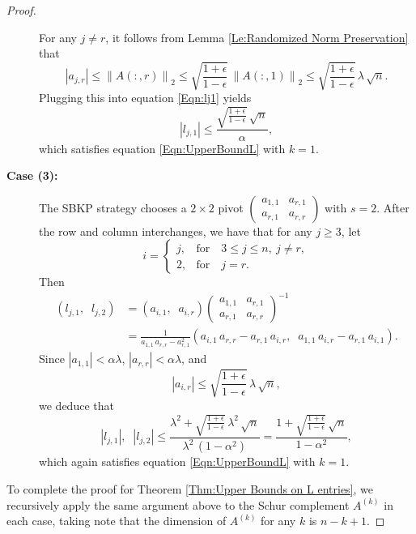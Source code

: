 \documentclass[11pt]{article}
\begin{document}
\begin{proof}
\begin{description}
For any $j \neq r$, it follows from Lemma \ref{Le:Randomized Norm Preservation} that 
$$
|a_{j, r} | \le \left\| A( : , r) \right\|_2 \le \sqrt{\frac{1 + \epsilon}{1 - \epsilon}}\, \left\|A( : , 1) \right\|_2 \le \sqrt{\frac{1 + \epsilon}{1 - \epsilon}}\, \lambda \, \sqrt{n}. 
$$
Plugging this into equation \eqref{Eqn:lj1} yields 
\[{\displaystyle \left| l_{j, 1} \right|  \le \frac{\sqrt{\frac{1 + \epsilon}{1 - \epsilon}} \, \sqrt{n}}{\alpha}}, \]
which satisfies equation \eqref{Eqn:UpperBoundL} with $k=1$. 
\item[{\bf Case (3):}] The SBKP strategy chooses a $2 \times 2$ pivot $\left( 
\begin{array}{cc}
a_{1,1} & a_{r,1} \\
a_{r,1} & a_{r,r}
\end{array}
\right)$ with $s = 2$. After the row and column interchanges, we have that for any $j \ge 3$, let 
\[ 
i = \left\{\begin{array}{ll} 
j, & \mbox{for}\quad 3 \le j \le n, ~j \not= r, \\
2, & \mbox{for}\quad j = r.\end{array}\right.\]
Then 
\begin{align*}
\left(l_{j, 1}, \;\; l_{j, 2}\right) &= \left(a_{i, 1}, \;\; a_{i, r}\right)  \left(
\begin{array}{cc}
a_{1,1} & a_{r,1} \\
a_{r,1} & a_{r,r}
\end{array}
\right)^{-1} \\
&= \frac{1}{a_{1,1} \, a_{r, r} - a_{r,1}^2}
\left(a_{i, 1} \, a_{r, r} - a_{r, 1} \, a_{i, r}, \;\; a_{1,1} \, a_{i, r} - a_{r, 1} \, a_{i, 1}\right).
\end{align*}
\noindent Since $| a_{1, 1} | < \alpha \lambda$, $| a_{r, r} | < \alpha \lambda$, and
\[| a_{i, r} | \le \sqrt{\frac{1 + \epsilon}{1 - \epsilon}}\, \lambda \, \sqrt{n}, \]
we deduce that 
$$
| l_{j, 1} | ,\;\; | l_{j, 2} | \le \frac{\lambda^2 +  \sqrt{\frac{1 + \epsilon}{1 - \epsilon}}\, \lambda^2 \, \sqrt{n}}{\lambda^2 \, (1 - \alpha^2)} = \frac{1 +  \sqrt{\frac{1 + \epsilon}{1 - \epsilon}}\, \sqrt{n} }{1 - \alpha^2}, 
$$
which again satisfies equation \eqref{Eqn:UpperBoundL} with $k=1$.
\end{description} 

To complete the proof for Theorem \ref{Thm:Upper Bounds on L entries}, we recursively apply the same argument above to the Schur complement $A^{(k)}$ in each case, taking note that the dimension of $A^{(k)}$ for any $k$ is $n-k+1$. 
\end{proof}
\end{document}

